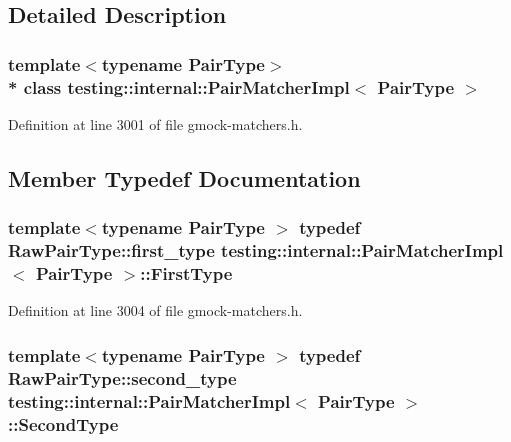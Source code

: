 \subsection{Detailed Description}
\subsubsection*{template$<$typename Pair\+Type$>$\\*
class testing\+::internal\+::\+Pair\+Matcher\+Impl$<$ Pair\+Type $>$}



Definition at line 3001 of file gmock-\/matchers.\+h.



\subsection{Member Typedef Documentation}
\subsubsection[{\texorpdfstring{First\+Type}{FirstType}}]{\setlength{\rightskip}{0pt plus 5cm}template$<$typename Pair\+Type $>$ typedef Raw\+Pair\+Type\+::first\+\_\+type {\bf testing\+::internal\+::\+Pair\+Matcher\+Impl}$<$ Pair\+Type $>$\+::{\bf First\+Type}}\hypertarget{classtesting_1_1internal_1_1_pair_matcher_impl_a9de66d76f0ebb0f107a9c18903b03176}{}\label{classtesting_1_1internal_1_1_pair_matcher_impl_a9de66d76f0ebb0f107a9c18903b03176}


Definition at line 3004 of file gmock-\/matchers.\+h.

\subsubsection[{\texorpdfstring{Second\+Type}{SecondType}}]{\setlength{\rightskip}{0pt plus 5cm}template$<$typename Pair\+Type $>$ typedef Raw\+Pair\+Type\+::second\+\_\+type {\bf testing\+::internal\+::\+Pair\+Matcher\+Impl}$<$ Pair\+Type $>$\+::{\bf Second\+Type}}\hypertarget{classtesting_1_1internal_1_1_pair_matcher_impl_ad63c9ff4f1aff81562efca293ff5aca9}{}\label{classtesting_1_1internal_1_1_pair_matcher_impl_ad63c9ff4f1aff81562efca293ff5aca9}


